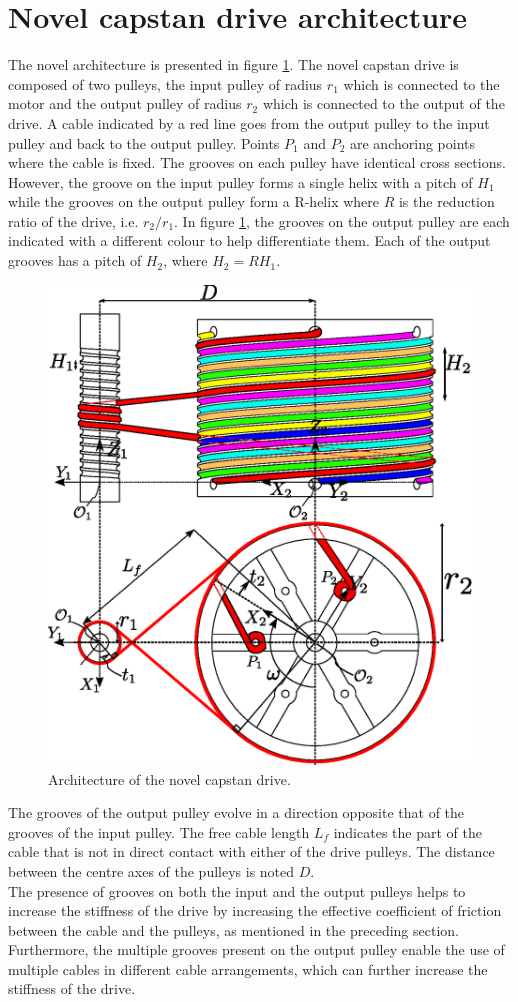 \documentclass[10pt,cleanfoot]{asme2ej}
\begin{document}
  \section{Novel capstan drive architecture}
 The novel architecture is presented in figure \ref{fig:novel_arch}. The novel capstan drive is composed of two pulleys, the input pulley of radius $r_1$ which is connected to the motor and the output pulley of radius $r_2$ which is connected to the output of the drive.  A cable indicated by a red line goes from the output pulley to the input pulley and back to the output pulley. Points $P_1$ and $P_2$ are anchoring points where the cable is fixed. The grooves on each pulley have identical cross sections. However, the groove on the input pulley forms a single helix with a pitch of $H_1$ while the grooves on the output pulley form a R-helix where $R$ is the reduction ratio of the drive, i.e. $r_2/r_1$. In figure \ref{fig:novel_arch}, the grooves on the output pulley are each indicated with a different colour to help differentiate them. Each of the output grooves has a pitch of $H_2$, where $H_2 = RH_1$.
 \begin{figure}
     \centering
     \includegraphics[width =0.3\columnwidth]{test_print_poulies.eps}
     \caption{Architecture of the novel capstan drive.}
     \label{fig:novel_arch}
 \end{figure}
 The grooves of the output pulley evolve in a direction opposite that of the grooves of the input pulley. The free cable length $L_f$ indicates the part of the cable that is not in direct contact with either of the drive pulleys. The distance between the centre axes of the pulleys is noted $D$. \\
 The presence of grooves on both the input and the output pulleys helps to increase the stiffness of the drive by increasing the effective coefficient of friction between the cable and the pulleys, as mentioned in the preceding section. Furthermore, the multiple grooves present on the output pulley enable the use of multiple cables in different cable arrangements, which can further increase the stiffness of the drive.\\
\end{document}
